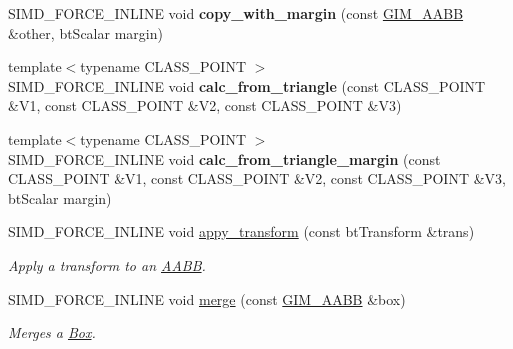 \begin{DoxyCompactItemize}
S\+I\+M\+D\+\_\+\+F\+O\+R\+C\+E\+\_\+\+I\+N\+L\+I\+NE void {\bfseries copy\+\_\+with\+\_\+margin} (const \hyperlink{classGIM__AABB}{G\+I\+M\+\_\+\+A\+A\+BB} \&other, bt\+Scalar margin)
\item 
\mbox{\label{classGIM__AABB_acc278ddfe507da3a10cfe1b575454939}} 
{\footnotesize template$<$typename C\+L\+A\+S\+S\+\_\+\+P\+O\+I\+NT $>$ }\\S\+I\+M\+D\+\_\+\+F\+O\+R\+C\+E\+\_\+\+I\+N\+L\+I\+NE void {\bfseries calc\+\_\+from\+\_\+triangle} (const C\+L\+A\+S\+S\+\_\+\+P\+O\+I\+NT \&V1, const C\+L\+A\+S\+S\+\_\+\+P\+O\+I\+NT \&V2, const C\+L\+A\+S\+S\+\_\+\+P\+O\+I\+NT \&V3)
\item 
\mbox{\label{classGIM__AABB_a01e3fb3fe6955ea31b657fa765c73c7a}} 
{\footnotesize template$<$typename C\+L\+A\+S\+S\+\_\+\+P\+O\+I\+NT $>$ }\\S\+I\+M\+D\+\_\+\+F\+O\+R\+C\+E\+\_\+\+I\+N\+L\+I\+NE void {\bfseries calc\+\_\+from\+\_\+triangle\+\_\+margin} (const C\+L\+A\+S\+S\+\_\+\+P\+O\+I\+NT \&V1, const C\+L\+A\+S\+S\+\_\+\+P\+O\+I\+NT \&V2, const C\+L\+A\+S\+S\+\_\+\+P\+O\+I\+NT \&V3, bt\+Scalar margin)
\item 
\mbox{\label{classGIM__AABB_adeb95bf6a8b4d0281b35adf33fbbfbdc}} 
S\+I\+M\+D\+\_\+\+F\+O\+R\+C\+E\+\_\+\+I\+N\+L\+I\+NE void \hyperlink{classGIM__AABB_adeb95bf6a8b4d0281b35adf33fbbfbdc}{appy\+\_\+transform} (const bt\+Transform \&trans)
\begin{DoxyCompactList}\small\item\em Apply a transform to an \hyperlink{classAABB}{A\+A\+BB}. \end{DoxyCompactList}\item 
\mbox{\label{classGIM__AABB_a75e41aceb9b1e8f4b90e702dcec19c13}} 
S\+I\+M\+D\+\_\+\+F\+O\+R\+C\+E\+\_\+\+I\+N\+L\+I\+NE void \hyperlink{classGIM__AABB_a75e41aceb9b1e8f4b90e702dcec19c13}{merge} (const \hyperlink{classGIM__AABB}{G\+I\+M\+\_\+\+A\+A\+BB} \&box)
\begin{DoxyCompactList}\small\item\em Merges a \hyperlink{classBox}{Box}. \end{DoxyCompactList}\item 
\mbox{\label{classGIM__AABB_a982f35ef44698918555a84419f0bbabf}} 

\end{DoxyCompactItemize}
